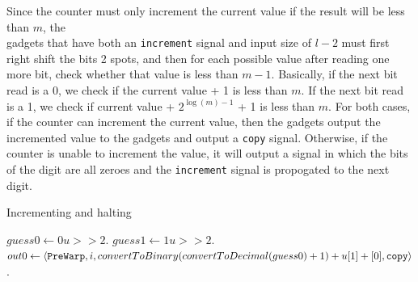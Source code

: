 \begin{itemize}
    Since the counter must only increment the current value if the result will be less than $m$,
    the \\{\cread} gadgets that have both an {\tt increment} signal and input size of $l - 2$ must
    first right shift the bits 2 spots, and then for each possible value after reading one more bit,
    check whether that value is less than $m - 1$. %
    Basically, if the next bit read is a 0, we check if the current value + 1 is less than $m$.
    If the next bit read is a 1, we check if current value + $2^{\log (m) - 1}$ + 1 is less than $m$.
    For both cases, if the counter can increment the current value, then the {\cread} gadgets output the incremented value to the {\prewarp} gadgets and output a {\tt copy} signal.
    Otherwise, if the counter is unable to increment the value, it will output a signal in which the bits of the digit are all zeroes and the {\tt increment} signal is propogated to the next digit.
    \begin{algorithm}[H]
        \caption{Incrementing and halting\label{asda}}
        \begin{algorithmic}[1]
                \State $guess0 \gets 0u >> 2$.
                \State $guess1 \gets 1u >> 2$.
                    \State $out0 \gets \left\langle {\tt PreWarp}, i, convertToBinary(convertToDecimal(guess0) + 1) + u[1] + [0], {\tt copy} \right\rangle$.

\end{algorithmic}
\end{algorithm}
\end{itemize}
